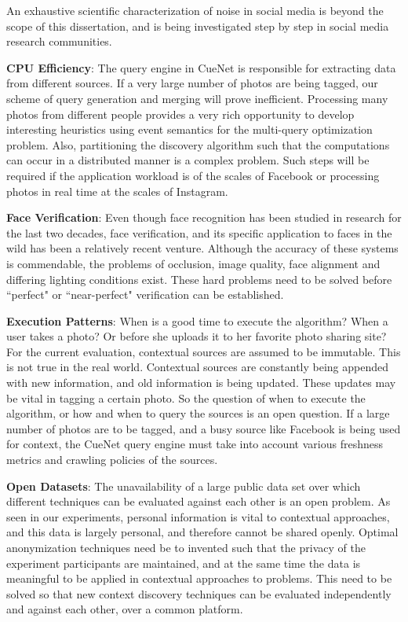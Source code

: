 An exhaustive scientific characterization of noise in social media is beyond the scope of this dissertation, and is being investigated step by step in social media research communities.

\textbf{\textbf{CPU Efficiency}}: The query engine in CueNet is responsible for extracting data from different sources. If a very large number of photos are being tagged, our scheme of query generation and merging will prove inefficient. Processing many photos from different people provides a very rich opportunity to develop interesting heuristics using event semantics for the multi-query optimization problem. Also, partitioning the discovery algorithm such that the computations can occur in a distributed manner is a complex problem. Such steps will be required if the application workload is of the scales of Facebook or processing photos in real time at the scales of Instagram.

\textbf{\textbf{Face Verification}}: Even though face recognition has been studied in research for the last two decades, face verification, and its specific application to faces in the wild has been a relatively recent venture. Although the accuracy of these systems is commendable, the problems of occlusion, image quality, face alignment and differing lighting conditions exist. These hard problems need to be solved before ``perfect" or ``near-perfect" verification can be established. 

\textbf{\textbf{Execution Patterns}}: When is a good time to execute the algorithm? When a user takes a photo? Or before she uploads it to her favorite photo sharing site? For the current evaluation, contextual sources are assumed to be immutable. This is not true in the real world. Contextual sources are constantly being appended with new information, and old information is being updated. These updates may be vital in tagging a certain photo. So the question of when to execute the algorithm, or how and when to query the sources is an open question. If a large number of photos are to be tagged, and a busy source like Facebook is being used for context, the CueNet query engine must take into account various freshness metrics and crawling policies of the sources. 

\textbf{\textbf{Open Datasets}}: The unavailability of a large public data set over which different techniques can be evaluated against each other is an open problem. As seen in our experiments, personal information is vital to contextual approaches, and this data is largely personal, and therefore cannot be shared openly. Optimal anonymization techniques need be to invented such that the privacy of the experiment participants are maintained, and at the same time the data is meaningful to be applied in contextual approaches to problems. This need to be solved so that new context discovery techniques can be evaluated independently and against each other, over a common platform.

